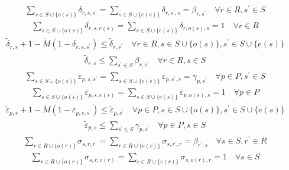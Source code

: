 \documentclass[UTF8,11pt]{ctexart}
\begin{document}
\[\begin{aligned}& \sum_{s \in S \cup \{o(s)\}} \delta_{r, s, s^{\prime}} = \sum_{s \in S \cup \{e(s)\}} \delta_{r, s^{\prime}, s} = \beta_{r, s^{\prime}} \quad \forall r \in R, s^{\prime} \in S\end{aligned}\]
\[\begin{aligned}& \sum_{s \in S \cup \{o(s)\}} \delta_{r, s, e(s)} = \sum_{s \in S \cup \{e(s)\}} \delta_{r, o(s), s} = 1 \quad \forall r \in R\end{aligned}\]
\[\begin{aligned}& \tilde{\delta}_{r, s} + 1 - \dot{M}(1 - \delta_{r, s, s^{\prime}}) \le \tilde{\delta}_{r, s^{\prime}} \quad \forall r \in R, s \in S \cup \{o(s)\}, s^{\prime} \in S \cup \{e(s)\}\end{aligned}\]
\[\begin{aligned}& \tilde{\delta}_{r, s} \le \sum_{s^{\prime} \in S} \beta_{r, s^{\prime}} \quad \forall r \in R, s \in S\end{aligned}\]
\[\begin{aligned}& \sum_{s \in S \cup \{o(s)\}} \varepsilon_{p, s, s^{\prime}} = \sum_{s \in S \cup \{e(s)\}} \varepsilon_{p, s^{\prime}, s} = \gamma_{p, s^{\prime}} \quad \forall p \in P, s^{\prime} \in S\end{aligned}\]
\[\begin{aligned}& \sum_{s \in S \cup \{o(s)\}} \varepsilon_{p, s, e(s)} = \sum_{s \in S \cup \{e(s)\}} \varepsilon_{p, o(s), s} = 1 \quad \forall p \in P\end{aligned}\]
\[\begin{aligned}& \tilde{\varepsilon}_{p, s} + 1 - \dot{M}(1 - \varepsilon_{p, s, s^{\prime}}) \le \tilde{\varepsilon}_{p, s^{\prime}} \quad \forall p \in P, s \in S \cup \{o(s)\}, s^{\prime} \in S \cup \{e(s)\}\end{aligned}\]
\[\begin{aligned}& \tilde{\varepsilon}_{p, s} \le \sum_{s^{\prime} \in S} \gamma_{p, s^{\prime}} \quad \forall p \in P, s \in S\end{aligned}\]
\[\begin{aligned}& \sum_{r \in R \cup \{o(r)\}} \sigma_{s, r, r^{\prime}} = \sum_{r \in R \cup \{e(r)\}} \sigma_{s, r^{\prime}, r} = \beta_{r^{\prime}, s} \quad \forall s \in S, r^{\prime} \in R\end{aligned}\]
\[\begin{aligned}& \sum_{r \in R \cup \{o(r)\}} \sigma_{s, r, e(r)} = \sum_{r \in R \cup \{e(r)\}} \sigma_{s, o(r), r} = 1 \quad \forall s \in S\end{aligned}\]
\end{document}

